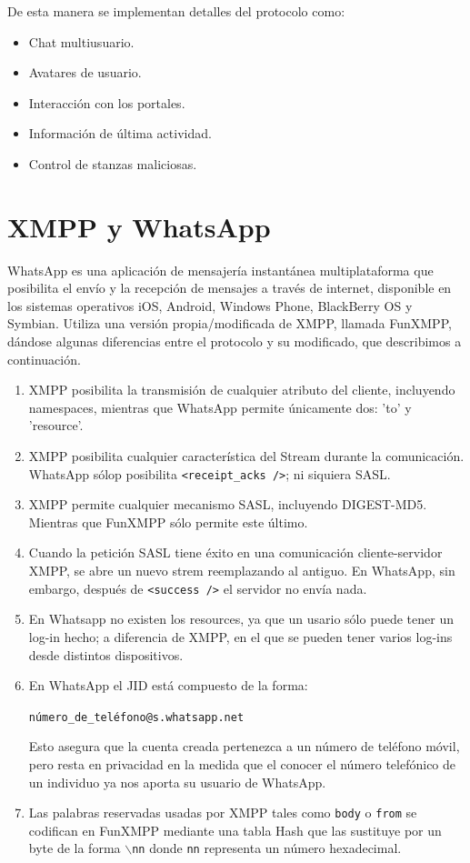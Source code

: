 \documentclass[a4paper, 11pt]{article} %
\begin{document}
    De esta manera se implementan detalles del protocolo como:
    \begin{itemize}
     \item Chat multiusuario.
     \item Avatares de usuario.
     \item Interacción con los portales.
     \item Información de última actividad.
     \item Control de stanzas maliciosas.
    \end{itemize}

\section{XMPP y WhatsApp}
  WhatsApp es una aplicación de mensajería instantánea multiplataforma que posibilita el envío y la recepción de mensajes a 
  través de internet, disponible en los sistemas operativos iOS, Android, Windows Phone, BlackBerry OS y Symbian. Utiliza una
  versión propia/modificada de XMPP, llamada FunXMPP, dándose algunas diferencias entre el protocolo y su modificado, que
  describimos a continuación.

  \begin{enumerate}
    \item XMPP posibilita la transmisión de cualquier atributo del cliente, incluyendo namespaces, mientras que WhatsApp
      permite únicamente dos: 'to' y 'resource'. %
    \item XMPP posibilita cualquier característica del Stream durante la comunicación. 
      WhatsApp sólop posibilita \texttt{<receipt\_acks />}; ni siquiera SASL.
    \item XMPP permite cualquier mecanismo SASL, incluyendo DIGEST-MD5. Mientras que FunXMPP sólo permite este último.
    \item Cuando la petición SASL tiene éxito en una comunicación cliente-servidor XMPP, se abre un nuevo strem reemplazando al antiguo.
      En WhatsApp, sin embargo, después de \texttt{<success />} el servidor no envía nada.
    \item En Whatsapp no existen los resources, ya que un usario sólo puede tener un log-in hecho; a diferencia de XMPP, en
      el que se pueden tener varios log-ins desde distintos dispositivos.
    \item En WhatsApp el JID está compuesto de la forma:
      \begin{center}
	\texttt{número\_de\_teléfono@s.whatsapp.net}
      \end{center}
      Esto asegura que la cuenta creada pertenezca a un número de teléfono móvil, pero resta en privacidad en la medida
      que el conocer el número telefónico de un individuo ya nos aporta su usuario de WhatsApp.
    \item Las palabras reservadas usadas por XMPP tales como \texttt{body} o \texttt{from} se codifican en FunXMPP mediante
      una tabla Hash que las sustituye por un byte de la forma $\backslash$\texttt{nn} donde \texttt{nn} representa un número
      hexadecimal.
  \end{enumerate}
\end{document}
